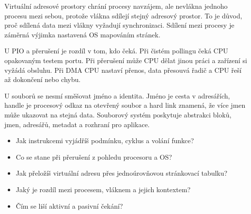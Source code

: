 \begin{odpoved}
Virtuální adresové prostory chrání procesy navzájem, ale nevlákna jednoho procesu mezi
sebou, protože vlákna sdílejí stejný adresový prostor. To je důvod, proč sdílená data
mezi vlákny vyžadují synchronizaci. Sdílení mezi procesy je záměrná výjimka nastavená OS
mapováním stránek.

U PIO a přerušení je rozdíl v tom, kdo čeká. Při čistém pollingu čeká CPU opakovaným
testem portu. Při přerušení může CPU dělat jinou práci a zařízení si vyžádá obsluhu.
Při DMA CPU nastaví přenos, data přesouvá řadič a CPU řeší až dokončení nebo chybu.

U souborů se nesmí směšovat jméno a identita. Jméno je cesta v adresářích, handle je
procesový odkaz na otevřený soubor a hard link znamená, že více jmen může ukazovat na
stejná data. Souborový systém poskytuje abstrakci bloků, jmen, adresářů, metadat a
rozhraní pro aplikace.
\end{odpoved}

\begin{recall}
\begin{itemize}[leftmargin=1.2em,itemsep=0pt,topsep=1pt]
  \item Jak instrukcemi vyjádříš podmínku, cyklus a volání funkce?
  \item Co se stane při přerušení z pohledu procesoru a OS?
  \item Jak přeložíš virtuální adresu přes jednoúrovňovou stránkovací tabulku?
  \item Jaký je rozdíl mezi procesem, vláknem a jejich kontextem?
  \item Čím se liší aktivní a pasivní čekání?
\end{itemize}
\end{recall}
